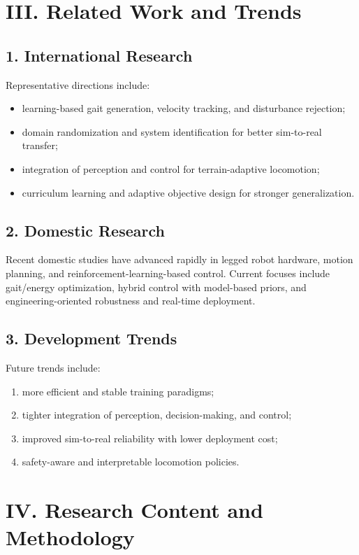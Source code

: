 \documentclass{article}
\begin{document}
\section*{III. Related Work and Trends}
\subsection*{1. International Research}
Representative directions include:
\begin{itemize}
  \item learning-based gait generation, velocity tracking, and disturbance rejection;
  \item domain randomization and system identification for better sim-to-real transfer;
  \item integration of perception and control for terrain-adaptive locomotion;
  \item curriculum learning and adaptive objective design for stronger generalization.
\end{itemize}

\subsection*{2. Domestic Research}
Recent domestic studies have advanced rapidly in legged robot hardware, motion planning, and reinforcement-learning-based control. Current focuses include gait/energy optimization, hybrid control with model-based priors, and engineering-oriented robustness and real-time deployment.

\subsection*{3. Development Trends}
Future trends include:
\begin{enumerate}
  \item more efficient and stable training paradigms;
  \item tighter integration of perception, decision-making, and control;
  \item improved sim-to-real reliability with lower deployment cost;
  \item safety-aware and interpretable locomotion policies.
\end{enumerate}

\section*{IV. Research Content and Methodology}
\end{document}

